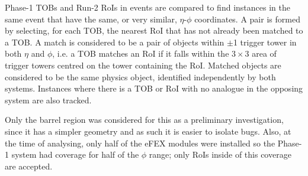 
Phase-1 \acp{TOB} and Run-2 \acp{RoI} in events are compared to find instances
in the same event that have the same, or very similar, $\eta$-$\phi$
coordinates. 
A pair is formed by selecting, for each \ac{TOB}, the nearest \ac{RoI} that
has not already been matched to a \ac{TOB}.
A match is considered to be a pair of objects within $\pm$1 trigger
tower in both $\eta$ and $\phi$, i.e. a \ac{TOB} matches an \ac{RoI} if it falls
within the $3\times3$ area of trigger towers centred on the tower containing the
\ac{RoI}. Matched objects are considered to be the same physics object,
identified independently by both systems. 
%
Instances where there is a \ac{TOB} or \ac{RoI} with no analogue in the opposing
system are also tracked.
%

Only the barrel region was considered for this as a preliminary investigation,
since it has a simpler geometry and as such it is easier to isolate bugs. Also,
at the time of analysing, only half of the eFEX modules were installed so the
Phase-1 system had coverage for half of the $\phi$ range; only \acp{RoI} inside
of this coverage are accepted.
